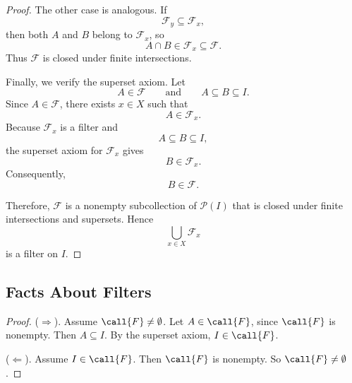 {\begin{proof}
The other case is analogous. If
\[
\mathcal{F}_y\subseteq\mathcal{F}_x,
\]
then both \(A\) and \(B\) belong to \(\mathcal{F}_x\), so
\[
A\cap B\in\mathcal{F}_x\subseteq\mathcal{F}.
\]
Thus \(\mathcal{F}\) is closed under finite intersections.

Finally, we verify the superset axiom. Let
\[
A\in\mathcal{F}
\qquad\text{and}\qquad
A\subseteq B\subseteq I.
\]
Since \(A\in\mathcal{F}\), there exists \(x\in X\) such that
\[
A\in\mathcal{F}_x.
\]
Because \(\mathcal{F}_x\) is a filter and
\[
A\subseteq B\subseteq I,
\]
the superset axiom for \(\mathcal{F}_x\) gives
\[
B\in\mathcal{F}_x.
\]
Consequently,
\[
B\in\mathcal{F}.
\]

Therefore, \(\mathcal{F}\) is a nonempty subcollection of
\(\mathcal{P}(I)\) that is closed under finite intersections and supersets.
Hence
\[
\bigcup_{x\in X}\mathcal{F}_x
\]
is a filter on \(I\).
\end{proof}

\subsection{Facts About Filters}
\begin{proof}
    ($\Rightarrow$). Assume $\call{F} \neq \emptyset$. Let $A \in \call{F}$, since $\call{F}$ is nonempty. Then $A \subseteq I$. By the superset axiom, $I \in \call{F}$.

    \noin ($\Leftarrow$). Assume $I \in \call{F}$. Then $\call{F}$ is nonempty. So $\call{F} \neq \emptyset$.
\end{proof}

}
